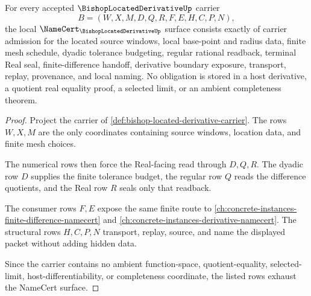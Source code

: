 \begin{theorem}
\label{thm:bishop-located-derivative-namecert-obligations}
For every accepted $\BishopLocatedDerivativeUp$ carrier
$$
B=(W,X,M,D,Q,R,F,E,H,C,P,N),
$$
the local $\NameCert_{\BishopLocatedDerivativeUp}$ surface consists exactly of carrier admission for the located source windows, local base-point and radius data, finite mesh schedule, dyadic tolerance budgeting, regular rational readback, terminal Real seal, finite-difference handoff, derivative boundary exposure, transport, replay, provenance, and local naming. No obligation is stored in a host derivative, a quotient real equality proof, a selected limit, or an ambient completeness theorem.
\end{theorem}
\begin{proof}
Project the carrier of \autoref{def:bishop-located-derivative-carrier}. The rows $W,X,M$ are the only coordinates containing source windows, location data, and finite mesh choices.

The numerical rows then force the Real-facing read through $D,Q,R$. The dyadic row $D$ supplies the finite tolerance budget, the regular row $Q$ reads the difference quotients, and the Real row $R$ seals only that readback.

The consumer rows $F,E$ expose the same finite route to \autoref{ch:concrete-instances-finite-difference-namecert} and \autoref{ch:concrete-instances-derivative-namecert}. The structural rows $H,C,P,N$ transport, replay, source, and name the displayed packet without adding hidden data.

Since the carrier contains no ambient function-space, quotient-equality, selected-limit, host-differentiability, or completeness coordinate, the listed rows exhaust the NameCert surface.
\end{proof}

